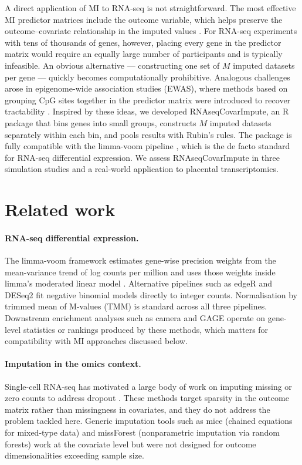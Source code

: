 A direct application of MI to RNA-seq is not straightforward. The most effective MI predictor matrices include the outcome variable, which helps preserve the outcome--covariate relationship in the imputed values \cite{vanbuuren2011mice}. For RNA-seq experiments with tens of thousands of genes, however, placing every gene in the predictor matrix would require an equally large number of participants and is typically infeasible. An obvious alternative --- constructing one set of $M$ imputed datasets per gene --- quickly becomes computationally prohibitive. Analogous challenges arose in epigenome-wide association studies (EWAS), where methods based on grouping CpG sites together in the predictor matrix were introduced to recover tractability \cite{mill2013epigenomewide,weinhold2020statistical}. Inspired by these ideas, we developed RNAseqCovarImpute, an R package that bins genes into small groups, constructs $M$ imputed datasets separately within each bin, and pools results with Rubin's rules. The package is fully compatible with the limma-voom pipeline \cite{law2014voom,ritchie2015limma}, which is the de facto standard for RNA-seq differential expression. We assess RNAseqCovarImpute in three simulation studies and a real-world application to placental transcriptomics.

\section{Related work}

\paragraph{RNA-seq differential expression.} The limma-voom framework estimates gene-wise precision weights from the mean-variance trend of log counts per million and uses those weights inside limma's moderated linear model \cite{law2014voom,ritchie2015limma}. Alternative pipelines such as edgeR \cite{robinson2010edger} and DESeq2 \cite{love2014deseq2} fit negative binomial models directly to integer counts. Normalisation by trimmed mean of M-values (TMM) \cite{robinson2010tmm} is standard across all three pipelines. Downstream enrichment analyses such as camera \cite{wu2012camera} and GAGE \cite{luo2009gage} operate on gene-level statistics or rankings produced by these methods, which matters for compatibility with MI approaches discussed below.

\paragraph{Imputation in the omics context.} Single-cell RNA-seq has motivated a large body of work on imputing missing or zero counts to address dropout \cite{hao2024scrnaseq}. These methods target sparsity in the outcome matrix rather than missingness in covariates, and they do not address the problem tackled here. Generic imputation tools such as mice (chained equations for mixed-type data) \cite{vanbuuren2011mice} and missForest (nonparametric imputation via random forests) \cite{stekhoven2012missforest} work at the covariate level but were not designed for outcome dimensionalities exceeding sample size.

